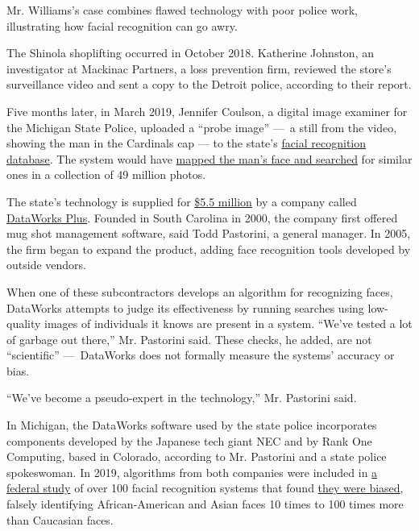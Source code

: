 Mr. Williams's case combines flawed technology with poor police work,
illustrating how facial recognition can go awry.

The Shinola shoplifting occurred in October 2018. Katherine Johnston, an
investigator at Mackinac Partners, a loss prevention firm, reviewed the
store's surveillance video and sent a copy to the Detroit police,
according to their report.

Five months later, in March 2019, Jennifer Coulson, a digital image
examiner for the Michigan State Police, uploaded a ``probe image'' ---~a
still from the video, showing the man in the Cardinals cap --- to the
state's
\href{https://www.michigan.gov/msp/0,4643,7-123-72297_64747_64749-357133--,00.html\#:~:text=The\%20Statewide\%20Network\%20of\%20Agency,data\%20for\%20law\%20enforcement\%20access.}{facial
recognition database}. The system would have
\href{https://www.michigan.gov/documents/msp/Facial_Recognition_FAQ_666807_7.pdf}{mapped
the man's face and searched} for similar ones in a collection of 49
million photos.

The state's technology is supplied for
\href{https://www.michigan.gov/documents/buymichiganfirst/0200097_307265_7.pdf}{\$5.5
million} by a company called
\href{http://www.dataworksplus.com/}{DataWorks Plus}. Founded in South
Carolina in 2000, the company first offered mug shot management
software, said Todd Pastorini, a general manager. In 2005, the firm
began to expand the product, adding face recognition tools developed by
outside vendors.

When one of these subcontractors develops an algorithm for recognizing
faces, DataWorks attempts to judge its effectiveness by running searches
using low-quality images of individuals it knows are present in a
system. ``We've tested a lot of garbage out there,'' Mr. Pastorini said.
These checks, he added, are not ``scientific'' ---~DataWorks does not
formally measure the systems' accuracy or bias.

``We've become a pseudo-expert in the technology,'' Mr. Pastorini said.

In Michigan, the DataWorks software used by the state police
incorporates components developed by the Japanese tech giant NEC and by
Rank One Computing, based in Colorado, according to Mr. Pastorini and a
state police spokeswoman. In 2019, algorithms from both companies were
included in
\href{https://nvlpubs.nist.gov/nistpubs/ir/2019/NIST.IR.8280.pdf}{a
federal study} of over 100 facial recognition systems that found
\href{https://www.nytimes.com/2019/12/19/technology/facial-recognition-bias.html}{they
were biased}, falsely identifying African-American and Asian faces 10
times to 100 times more than Caucasian faces.

